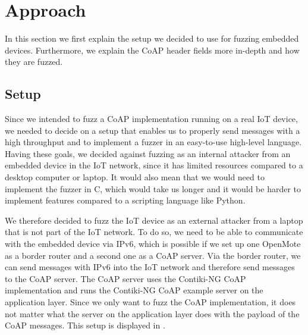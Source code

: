 \section{Approach}
\label{section:approach}


In this section we first explain the setup we decided to use for fuzzing embedded devices. Furthermore, we explain the CoAP header fields more in-depth and how they are fuzzed.

\subsection{Setup}
Since we intended to fuzz a CoAP implementation running on a real IoT device, we needed to decide on a setup that enables us to properly send messages with a high throughput and to implement a fuzzer in an easy-to-use high-level language. Having these goals, we decided against fuzzing as an internal attacker from an embedded device in the IoT network, since it has limited resources compared to a desktop computer or laptop. It would also mean that we would need to implement the fuzzer in C, which would take us longer and it would be harder to implement features compared to a scripting language like Python.

We therefore decided to fuzz the IoT device as an external attacker from a laptop that is not part of the IoT network. To do so, we need to be able to communicate with the embedded device via IPv6, which is possible if we set up one OpenMote as a border router and a second one as a CoAP server. Via the border router, we can send messages with IPv6 into the IoT network and therefore send messages to the CoAP server. The CoAP server uses the Contiki-NG CoAP implementation and runs the Contiki-NG CoAP example server on the application layer. Since we only want to fuzz the CoAP implementation, it does not matter what the server on the application layer does with the payload of the CoAP messages. This setup is displayed in .

